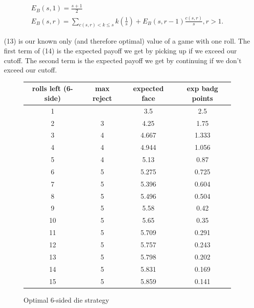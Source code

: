\documentclass[11pt, oneside]{article} 	%
\begin{document}
\begin{align}
E_B(s, 1) = \frac{s+1}{2} \\
E_B(s, r) = \sum_{c(s,r) < k \leq s} k(\frac{1}{s}) + E_B(s, r-1)\frac{c(s,r)}{s}, r > 1.
\end{align}

(13) is our known only (and therefore optimal) value of a game with one roll.
The first term of (14) is the expected payoff we get by picking up if we exceed our cutoff. The second term is the expected payoff we get by continuing if we don't exceed our cutoff.

\begin{figure}[!htb]
\begin{tabular}{c | c c c}
rolls left (6-side) & max reject & expected face & exp badg points \\
\hline
1 &  & 3.5 & 2.5 \\
2 & \cellcolor{cyan} 3 & 4.25 & 1.75 \\
3 & 4 & 4.667 & 1.333 \\
4 & 4 & 4.944 & 1.056 \\
5 & \cellcolor{cyan} 4 & 5.13 & 0.87 \\
6 & 5 & 5.275 & 0.725 \\
7 & 5 & 5.396 & 0.604 \\
8 & 5 & 5.496 & 0.504 \\
9 & 5 & 5.58 & 0.42 \\
10 & 5 & 5.65 & 0.35 \\
11 & 5 & 5.709 & 0.291 \\
12 & 5 & 5.757 & 0.243 \\
13 & 5 & 5.798 & 0.202 \\
14 & 5 & 5.831 & 0.169 \\
15 & 5 & 5.859 & 0.141 \\
\end{tabular}
\caption{Optimal 6-sided die strategy}
\label{fig:optimal6}
\end{figure}
\end{document}
